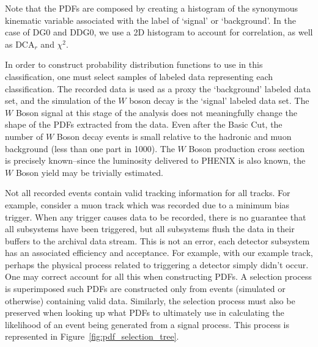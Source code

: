 Note that the PDFs are composed by creating a histogram of the synonymous
kinematic variable associated with the label of `signal' or `background'. In the
case of DG0 and DDG0, we use a 2D histogram to account for correlation, as well
as DCA$_r$ and $\chi^2$.

In order to construct probability distribution functions to use in this
classification, one must select samples of labeled data representing each
classification. The recorded data is used as a proxy the `background' labeled
data set, and the simulation of the $W$ boson decay is the `signal' labeled data
set. The $W$ Boson signal at this stage of the analysis does not meaningfully
change the shape of the PDFs extracted from the data. Even after the Basic Cut,
the number of $W$ Boson decay events is small relative to the hadronic and muon
background (less than one part in 1000). The $W$ Boson production cross section
is precisely known--since the luminosity delivered to PHENIX is also known, the
$W$ Boson yield may be trivially estimated.

Not all recorded events contain valid tracking information for all tracks. For
example, consider a muon track which was recorded due to a minimum bias trigger.
When any trigger causes data to be recorded, there is no guarantee that all
subsystems have been triggered, but all subsystems flush the data in their
buffers to the archival data stream. This is not an error, each detector
subsystem has an associated efficiency and acceptance.  For example, with our
example track, perhaps the physical process related to triggering a detector
simply didn't occur. One may correct account for all this when constructing
PDFs.  A selection process is superimposed such PDFs are constructed only from
events (simulated or otherwise) containing valid data. Similarly, the selection
process must also be preserved when looking up what PDFs to ultimately use in
calculating the likelihood of an event being generated from a signal process.
This process is represented in Figure~\ref{fig:pdf_selection_tree}.

